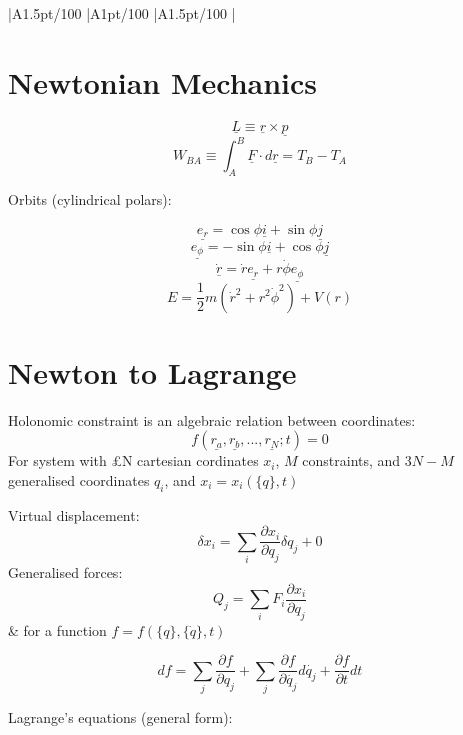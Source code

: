 \documentclass[table,cmyk]{article}
\makeatletter
\newcommand\ratio[2]{\strip@pt\dimexpr#1pt/#2\relax}
\makeatother
\begin{document}
\begin{longtable}
{
    |A{1.5}{\ratio{30}{100}}%
    |A{1}{\ratio{30}{100}}%
    |A{1.5}{\ratio{30}{100}}%
    |%
}\hline
\section*{Newtonian Mechanics}
\[ \underline{L} \equiv \underline{r} \times \underline{p}\]
\[ W_{BA} \equiv \int_{A}^{B} \underline{F}\cdot d\underline{r} = T_B - T_A\]

Orbits (cylindrical polars):

\[\underline{e_r} = \cos\phi\underline{i} + \sin\phi\underline{j}
\]\[
\underline{e_{\phi}} = -\sin\phi\underline{i} + \cos\phi\underline{j}\]
\[\underline{\dot{r}} = \dot{r} \underline{e_r} + r \dot{\phi} \underline{e_{\phi}}\]
\[E = \frac{1}{2}m(\dot{r}^2 + r^2\dot{\phi}^2) +V(r)\]

\section*{Newton to Lagrange}
Holonomic constraint is an algebraic relation between coordinates:
\[f(\underline{r_a},\underline{r_b},...,\underline{r_N};t) = 0\]
For system with £N cartesian cordinates $x_i$, $M$ constraints, and $3N-M$ generalised coordinates $q_i$, and $x_i = x_i(\{q\},t)$
\newline

Virtual displacement:
\[\delta x_i = \sum_{i} \frac{\partial x_i}{\partial q_j} \delta q_j + 0\]
Generalised forces:
\[Q_j = \sum_{i} F_i \frac{\partial x_i}{\partial q_j}\]
&
for a function $f = f(\{q\},\{\dot{q}\},t)$

\[df = \sum_{j} \frac{\partial f}{\partial q_j} + \sum_{j} \frac {\partial f}{\partial \dot{q_j}} d\dot{q_j} + \frac{\partial f}{\partial t}dt\]

Lagrange's equations (general form):


\end{longtable}
\end{document}
